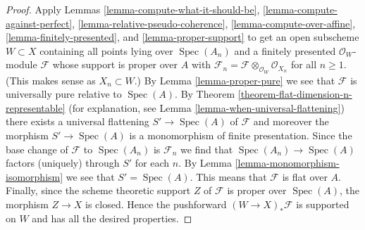 \documentclass[10pt,a4paper]{amsart}
\theoremstyle{plain}
\theoremstyle{definition}
\theoremstyle{remark}
\numberwithin{equation}{subsection}
\def\Spec{\mathop{\mathrm{Spec}}}
\begin{document}
\begin{proof}
Apply Lemmas \ref{lemma-compute-what-it-should-be},
\ref{lemma-compute-against-perfect},
\ref{lemma-relative-pseudo-coherence},
\ref{lemma-compute-over-affine},
\ref{lemma-finitely-presented}, and
\ref{lemma-proper-support}
to get an open subscheme $W \subset X$ containing all points
lying over $\Spec(A_n)$
and a finitely presented $\mathcal{O}_W$-module $\mathcal{F}$
whose support is proper over $A$ with
$\mathcal{F}_n = \mathcal{F} \otimes_{\mathcal{O}_W} \mathcal{O}_{X_n}$
for all $n \geq 1$. (This makes sense as $X_n \subset W$.)
By Lemma \ref{lemma-proper-pure} we see that $\mathcal{F}$
is universally pure relative to $\Spec(A)$.
By Theorem \ref{theorem-flat-dimension-n-representable}
(for explanation, see Lemma \ref{lemma-when-universal-flattening})
there exists a universal flattening $S' \to \Spec(A)$
of $\mathcal{F}$ and moreover the morphism $S' \to \Spec(A)$
is a monomorphism of finite presentation.
Since the base change of $\mathcal{F}$ to $\Spec(A_n)$
is $\mathcal{F}_n$ we find that $\Spec(A_n) \to \Spec(A)$
factors (uniquely) through $S'$ for each $n$.
By Lemma \ref{lemma-monomorphism-isomorphism}
we see that $S' = \Spec(A)$.
This means that $\mathcal{F}$ is flat over $A$.
Finally, since the scheme theoretic support $Z$ of $\mathcal{F}$
is proper over $\Spec(A)$, the morphism $Z \to X$ is closed.
Hence the pushforward $(W \to X)_*\mathcal{F}$ is supported
on $W$ and has all the desired properties.
\end{proof}
\end{document}
